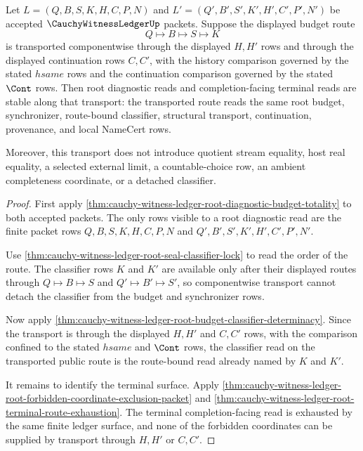 \begin{theorem}
\label{thm:cauchy-witness-ledger-root-diagnostic-budget-transport}
Let $L=(Q,B,S,K,H,C,P,N)$ and $L'=(Q',B',S',K',H',C',P',N')$ be accepted $\CauchyWitnessLedgerUp$ packets. Suppose the displayed budget route
$$
Q \longmapsto B \longmapsto S \longmapsto K
$$
is transported componentwise through the displayed $H,H'$ rows and through the displayed continuation rows $C,C'$, with the history comparison governed by the stated $hsame$ rows and the continuation comparison governed by the stated $\Cont$ rows. Then root diagnostic reads and completion-facing terminal reads are stable along that transport: the transported route reads the same root budget, synchronizer, route-bound classifier, structural transport, continuation, provenance, and local NameCert rows.

Moreover, this transport does not introduce quotient stream equality, host real equality, a selected external limit, a countable-choice row, an ambient completeness coordinate, or a detached classifier.
\end{theorem}
\begin{proof}
First apply \autoref{thm:cauchy-witness-ledger-root-diagnostic-budget-totality} to both accepted packets. The only rows visible to a root diagnostic read are the finite packet rows $Q,B,S,K,H,C,P,N$ and $Q',B',S',K',H',C',P',N'$.

Use \autoref{thm:cauchy-witness-ledger-root-seal-classifier-lock} to read the order of the route. The classifier rows $K$ and $K'$ are available only after their displayed routes through $Q \longmapsto B \longmapsto S$ and $Q' \longmapsto B' \longmapsto S'$, so componentwise transport cannot detach the classifier from the budget and synchronizer rows.

Now apply \autoref{thm:cauchy-witness-ledger-root-budget-classifier-determinacy}. Since the transport is through the displayed $H,H'$ and $C,C'$ rows, with the comparison confined to the stated $hsame$ and $\Cont$ rows, the classifier read on the transported public route is the route-bound read already named by $K$ and $K'$.

It remains to identify the terminal surface. Apply \autoref{thm:cauchy-witness-ledger-root-forbidden-coordinate-exclusion-packet} and \autoref{thm:cauchy-witness-ledger-root-terminal-route-exhaustion}. The terminal completion-facing read is exhausted by the same finite ledger surface, and none of the forbidden coordinates can be supplied by transport through $H,H'$ or $C,C'$.
\end{proof}


